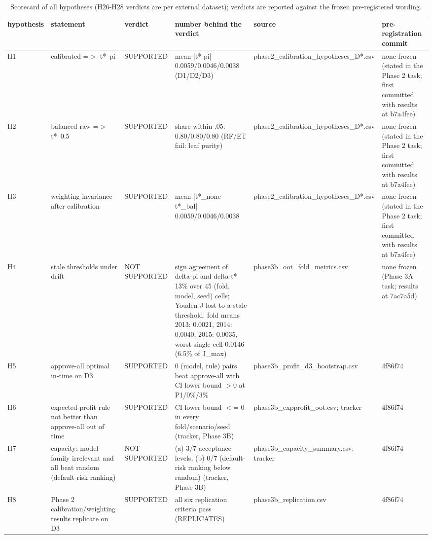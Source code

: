 \begin{table}[t]
\centering
\caption{Scorecard of all hypotheses (H26-H28 verdicts are per external dataset); verdicts are reported against the frozen pre-registered wording.}
\label{tab:T14_hypothesis_scorecard}
\small
\begin{tabular}{lp{5.2cm}p{5.2cm}p{5.2cm}lp{5.2cm}}
\toprule
hypothesis & statement & verdict & number behind the verdict & source & pre-registration commit \\
\midrule
H1 & calibrated =$>$ t*~pi & SUPPORTED & mean |t*-pi| 0.0059/0.0046/0.0038 (D1/D2/D3) & phase2\_calibration\_hypotheses\_D*.csv & none frozen (stated in the Phase 2 task; first committed with results at b7a4fee) \\
H2 & balanced raw =$>$ t*~0.5 & SUPPORTED & share within .05: 0.80/0.80/0.80 (RF/ET fail: leaf purity) & phase2\_calibration\_hypotheses\_D*.csv & none frozen (stated in the Phase 2 task; first committed with results at b7a4fee) \\
H3 & weighting invariance after calibration & SUPPORTED & mean |t*\_none - t*\_bal| 0.0059/0.0046/0.0038 & phase2\_calibration\_hypotheses\_D*.csv & none frozen (stated in the Phase 2 task; first committed with results at b7a4fee) \\
H4 & stale thresholds under drift & NOT SUPPORTED & sign agreement of delta-pi and delta-t* 13\% over 45 (fold, model, seed) cells; Youden J lost to a stale threshold: fold means 2013: 0.0021, 2014: 0.0040, 2015: 0.0035, worst single cell 0.0146 (6.5\% of J\_max) & phase3b\_oot\_fold\_metrics.csv & none frozen (Phase 3A task; results at 7ac7a5d) \\
H5 & approve-all optimal in-time on D3 & SUPPORTED & 0 (model, rule) pairs beat approve-all with CI lower bound $>$0 at P1/0\%/3\% & phase3b\_profit\_d3\_bootstrap.csv & 4f86f74 \\
H6 & expected-profit rule not better than approve-all out of time & SUPPORTED & CI lower bound $<$= 0 in every fold/scenario/seed (tracker, Phase 3B) & phase3b\_expprofit\_oot.csv; tracker & 4f86f74 \\
H7 & capacity: model family irrelevant and all beat random (default-risk ranking) & NOT SUPPORTED & (a) 3/7 acceptance levels, (b) 0/7 (default-risk ranking below random) (tracker, Phase 3B) & phase3b\_capacity\_summary.csv; tracker & 4f86f74 \\
H8 & Phase 2 calibration/weighting results replicate on D3 & SUPPORTED & all six replication criteria pass (REPLICATES) & phase3b\_replication.csv & 4f86f74 \\

\end{tabular}
\end{table}
